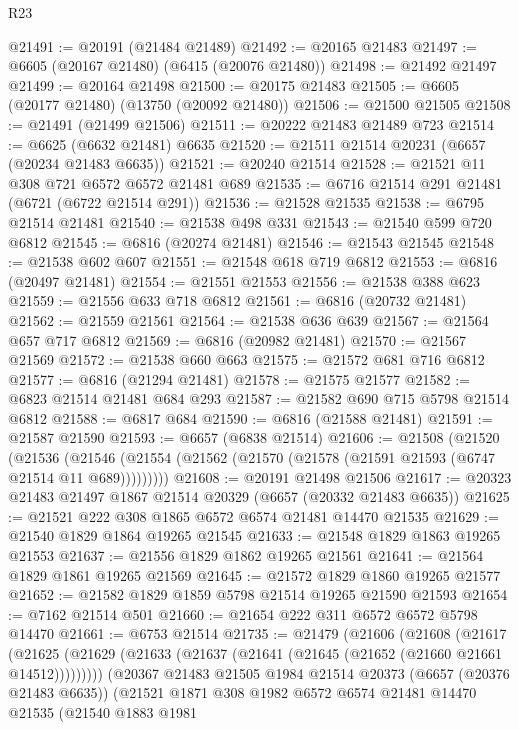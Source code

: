 \begin{lexlean}{R23}
\begin{coremodule}
@21491 := @20191 (@21484 @21489)
@21492 := @20165 @21483
@21497 := @6605 (@20167 @21480) (@6415 (@20076 @21480))
@21498 := @21492 @21497
@21499 := @20164 @21498
@21500 := @20175 @21483
@21505 := @6605 (@20177 @21480) (@13750 (@20092 @21480))
@21506 := @21500 @21505
@21508 := @21491 (@21499 @21506)
@21511 := @20222 @21483 @21489 @723
@21514 := @6625 (@6632 @21481) @6635
@21520 := @21511 @21514 @20231 (@6657 (@20234 @21483 @6635))
@21521 := @20240 @21514
@21528 := @21521 @11 @308 @721 @6572 @6572 @21481 @689
@21535 := @6716 @21514 @291 @21481 (@6721 (@6722 @21514 @291))
@21536 := @21528 @21535
@21538 := @6795 @21514 @21481
@21540 := @21538 @498 @331
@21543 := @21540 @599 @720 @6812
@21545 := @6816 (@20274 @21481)
@21546 := @21543 @21545
@21548 := @21538 @602 @607
@21551 := @21548 @618 @719 @6812
@21553 := @6816 (@20497 @21481)
@21554 := @21551 @21553
@21556 := @21538 @388 @623
@21559 := @21556 @633 @718 @6812
@21561 := @6816 (@20732 @21481)
@21562 := @21559 @21561
@21564 := @21538 @636 @639
@21567 := @21564 @657 @717 @6812
@21569 := @6816 (@20982 @21481)
@21570 := @21567 @21569
@21572 := @21538 @660 @663
@21575 := @21572 @681 @716 @6812
@21577 := @6816 (@21294 @21481)
@21578 := @21575 @21577
@21582 := @6823 @21514 @21481 @684 @293
@21587 := @21582 @690 @715 @5798 @21514 @6812
@21588 := @6817 @684
@21590 := @6816 (@21588 @21481)
@21591 := @21587 @21590
@21593 := @6657 (@6838 @21514)
@21606 := @21508
    (@21520
      (@21536 (@21546 (@21554 (@21562 (@21570 (@21578 (@21591 @21593 (@6747 @21514 @11 @689)))))))))
@21608 := @20191 @21498 @21506
@21617 := @20323 @21483 @21497 @1867 @21514 @20329 (@6657 (@20332 @21483 @6635))
@21625 := @21521 @222 @308 @1865 @6572 @6574 @21481 @14470 @21535
@21629 := @21540 @1829 @1864 @19265 @21545
@21633 := @21548 @1829 @1863 @19265 @21553
@21637 := @21556 @1829 @1862 @19265 @21561
@21641 := @21564 @1829 @1861 @19265 @21569
@21645 := @21572 @1829 @1860 @19265 @21577
@21652 := @21582 @1829 @1859 @5798 @21514 @19265 @21590 @21593
@21654 := @7162 @21514 @501
@21660 := @21654 @222 @311 @6572 @6572 @5798 @14470
@21661 := @6753 @21514
@21735 := @21479
    (@21606
      (@21608
        (@21617
          (@21625 (@21629 (@21633 (@21637 (@21641 (@21645 (@21652 (@21660 @21661 @14512)))))))))
        (@20367
          @21483
          @21505
          @1984
          @21514
          @20373
          (@6657 (@20376 @21483 @6635))
          (@21521
            @1871
            @308
            @1982
            @6572
            @6574
            @21481
            @14470
            @21535
            (@21540
              @1883
              @1981

\end{coremodule}
\end{lexlean}

